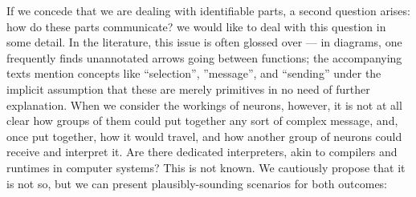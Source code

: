 If we concede that we are dealing with identifiable parts, a second question arises: how do these parts communicate? we would like to deal with this question in some detail. In the literature, this issue is often glossed over --- in diagrams, one frequently finds unannotated arrows going between functions; the accompanying texts mention concepts like ``selection'', ''message'', and ``sending'' under the implicit assumption that these are merely primitives in no need of further explanation. When we consider the workings of neurons, however, it is not at all clear how groups of them could put together any sort of complex message, and, once put together, how it would travel, and how another group of neurons could receive and interpret it. Are there dedicated interpreters, akin to compilers and runtimes in computer systems? This is not known. We cautiously propose that it is not so, but we can present plausibly-sounding scenarios for both outcomes:
